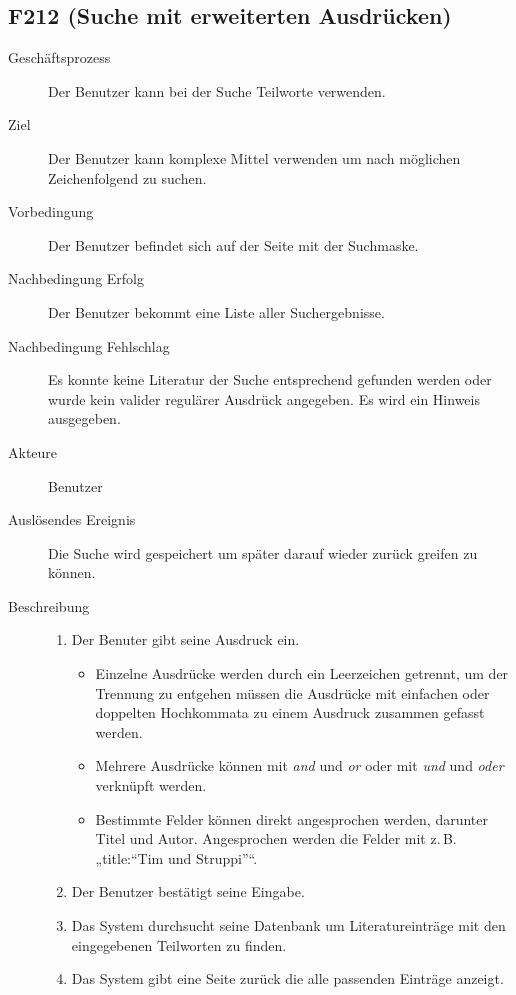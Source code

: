 \subsection{F212 (Suche mit erweiterten Ausdrücken)}
\begin{description}
  \item[Geschäftsprozess]Der Benutzer kann bei der Suche Teilworte verwenden.
  \item[Ziel]Der Benutzer kann komplexe Mittel verwenden um nach möglichen Zeichenfolgend zu suchen.
  \item[Vorbedingung]Der Benutzer befindet sich auf der Seite mit der Suchmaske.
  \item[Nachbedingung Erfolg]Der Benutzer bekommt eine Liste aller Suchergebnisse.
  \item[Nachbedingung Fehlschlag]Es konnte keine Literatur der Suche entsprechend gefunden werden oder wurde kein valider regulärer Ausdrück angegeben. Es wird ein Hinweis ausgegeben.
  \item[Akteure]Benutzer
  \item[Auslösendes Ereignis]Die Suche wird gespeichert um später darauf wieder zurück greifen zu können.
  \item[Beschreibung]
    \begin{enumerate}
      \item Der Benuter gibt seine Ausdruck ein. 
	\begin{itemize}
	  \item Einzelne Ausdrücke werden durch ein Leerzeichen getrennt, um der Trennung zu entgehen müssen die Ausdrücke mit einfachen oder doppelten Hochkommata zu einem Ausdruck zusammen gefasst werden. 
	  \item Mehrere Ausdrücke können mit \emph{and} und \emph{or} oder mit \emph{und} und \emph{oder} verknüpft werden.
	  \item Bestimmte Felder können direkt angesprochen werden, darunter Titel und Autor. Angesprochen werden die Felder mit z.\,B. „title:``Tim und Struppi''“.
	\end{itemize}
      \item Der Benutzer bestätigt seine Eingabe.
      \item Das System durchsucht seine Datenbank um Literatureinträge mit den eingegebenen Teilworten zu finden.
      \item Das System gibt eine Seite zurück die alle passenden Einträge anzeigt.
    \end{enumerate}
\end{description}


